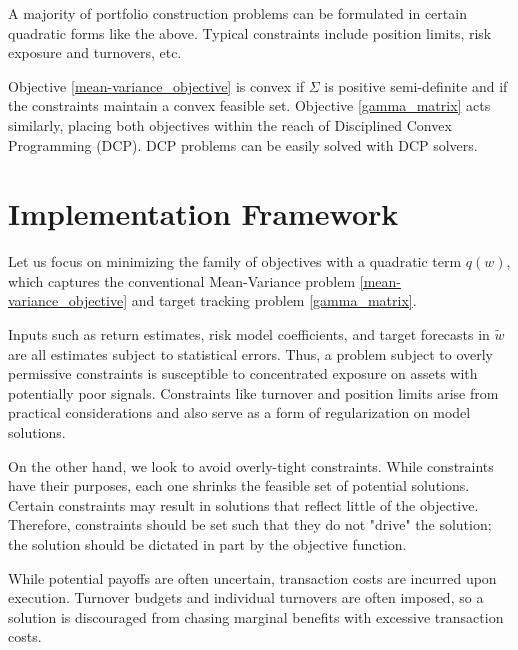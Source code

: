 \documentclass[11pt, letterpaper]{article}
\begin{document}
A majority of portfolio construction problems can be formulated in certain quadratic forms like the above. Typical constraints
include position limits, risk exposure and turnovers, etc.

Objective \eqref{mean-variance_objective} is convex if $\Sigma$ is positive semi-definite and if the constraints
maintain a convex feasible set. Objective \eqref{gamma_matrix} acts similarly, placing both objectives within the reach of
Disciplined Convex Programming (DCP). DCP problems can be easily solved with DCP solvers.



\section{Implementation Framework}

Let us focus on minimizing the family of objectives with a quadratic term $q(w)$, which captures the conventional Mean-Variance
problem \eqref{mean-variance_objective} and target tracking problem \eqref{gamma_matrix}.

Inputs such as return estimates, risk model coefficients, and target forecasts in $\tilde{w}$ are all estimates subject to
statistical errors. Thus, a problem subject to overly permissive constraints is susceptible to concentrated exposure on assets
with potentially poor signals. Constraints like turnover and position limits arise from practical considerations and also serve as a
form of regularization on model solutions.

On the other hand, we look to avoid overly-tight constraints. While constraints have their purposes, each one shrinks the feasible set of
potential solutions. Certain constraints may result in solutions that reflect little of the objective. Therefore, constraints should be set
such that they do not "drive" the solution; the solution should be dictated in part by the objective function.

While potential payoffs are often uncertain, transaction costs are incurred upon execution. Turnover budgets and individual
turnovers are often imposed, so a solution is discouraged from chasing marginal benefits with excessive transaction costs.
\end{document}
